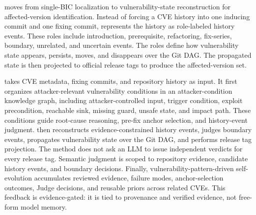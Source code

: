 \toolname{} moves from single-BIC localization to vulnerability-state reconstruction for affected-version identification. Instead of forcing a CVE history into one inducing commit and one fixing commit, \toolname{} represents the history as role-labeled history events. These roles include introduction, prerequisite, refactoring, fix-series, boundary, unrelated, and uncertain events. The roles define how vulnerability state appears, persists, moves, and disappears over the Git DAG. The propagated state is then projected to official release tags to produce the affected-version set.

\toolname{} takes CVE metadata, fixing commits, and repository history as input. It first organizes attacker-relevant vulnerability conditions in an attacker-condition knowledge graph, including attacker-controlled input, trigger condition, exploit precondition, reachable sink, missing guard, unsafe state, and impact path. These conditions guide root-cause reasoning, pre-fix anchor selection, and history-event judgment. \toolname{} then reconstructs evidence-constrained history events, judges boundary events, propagates vulnerability state over the Git DAG, and performs release tag projection. The method does not ask an LLM to issue independent verdicts for every release tag. Semantic judgment is scoped to repository evidence, candidate history events, and boundary decisions. Finally, vulnerability-pattern-driven self-evolution accumulates reviewed evidence, failure modes, anchor-selection outcomes, Judge decisions, and reusable priors across related CVEs. This feedback is evidence-gated: it is tied to provenance and verified evidence, not free-form model memory.


